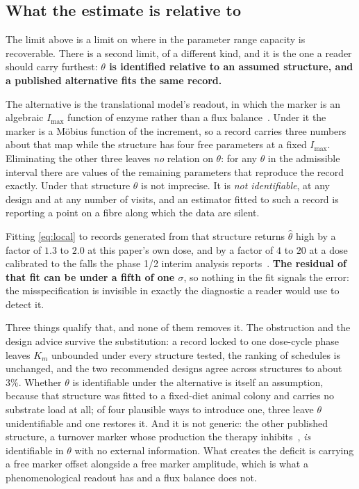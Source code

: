 \subsection{What the estimate is relative to}
\label{sec:structuredep}

The limit above is a limit on where in the parameter range capacity is recoverable. There
is a second limit, of a different kind, and it is the one a reader should carry furthest:
\textbf{$\theta$ is identified relative to an assumed structure, and a published
alternative fits the same record.}

The alternative is the translational model's readout, in which the marker is an algebraic
$I_{\max}$ function of enzyme rather than a flux balance~\cite{pkpd_translational}. Under
it the marker is a M\"obius function of the increment, so a record carries three numbers
about that map while the structure has four free parameters at a fixed $I_{\max}$.
Eliminating the other three leaves \emph{no} relation on $\theta$: for any $\theta$ in the
admissible interval there are values of the remaining parameters that reproduce the record
exactly. Under that structure $\theta$ is not imprecise. It is \emph{not identifiable}, at
any design and at any number of visits, and an estimator fitted to such a record is
reporting a point on a fibre along which the data are silent.

Fitting \eqref{eq:local} to records generated from that structure returns $\hat\theta$ high
by a factor of $1.3$ to $2.0$ at this paper's own dose, and by a factor of $4$ to $20$ at a
dose calibrated to the falls the phase 1/2 interim analysis reports~\cite{trial_phase12}.
\textbf{The residual of that fit can be under a fifth of one $\sigma$}, so nothing in the
fit signals the error: the misspecification is invisible in exactly the diagnostic a reader
would use to detect it.

Three things qualify that, and none of them removes it. The obstruction and the design
advice survive the substitution: a record locked to one dose-cycle phase leaves $K_m$
unbounded under every structure tested, the ranking of schedules is unchanged, and the two
recommended designs agree across structures to about $3\%$. Whether $\theta$ is
identifiable under the alternative is itself an assumption, because that structure was
fitted to a fixed-diet animal colony and carries no substrate load at all; of four
plausible ways to introduce one, three leave $\theta$ unidentifiable and one restores it.
And it is not generic: the other published structure, a turnover marker whose production
the therapy inhibits~\cite{dose_selection_poster,mrna_moa}, \emph{is} identifiable in
$\theta$ with no external information. What creates the deficit is carrying a free marker
offset alongside a free marker amplitude, which is what a phenomenological readout has and
a flux balance does not.

